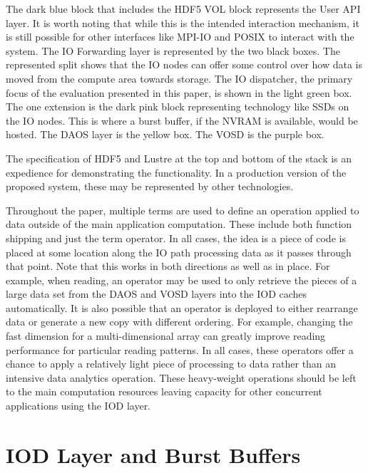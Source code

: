 \documentclass[conference]{IEEEtran}
\begin{document}
The dark blue block that includes the HDF5 VOL block represents the User API
layer. It is worth noting that while this is the intended interaction
mechanism, it is still possible for other interfaces like MPI-IO and POSIX to
interact with the system. The IO Forwarding layer is represented by the two
black boxes. The represented split shows that the IO nodes can offer some
control over how data is moved from the compute area towards storage. The
IO dispatcher, the primary focus of the evaluation presented in this paper, is
shown in the light green box. The one extension is the dark pink block
representing technology like SSDs on the IO nodes. This is where a burst
buffer, if the NVRAM is available, would be hosted. The DAOS layer is the
yellow box. The VOSD is the purple box.

The specification of HDF5 and Lustre at the top and bottom of the stack is 
an expedience for demonstrating the functionality. In a production version of
the proposed system, these may be represented by other technologies.

Throughout the paper, multiple terms are used to define an operation applied to
data outside of the main application computation. These include both function
shipping and just the term operator. In all cases, the idea is a piece of code
is placed at some location along the IO path processing data as it passes
through that point. Note that this works in both directions as well as in
place. For example, when reading, an operator may be used to only retrieve the
pieces of a large data set from the DAOS and VOSD layers into the IOD caches
automatically.  It is also possible that an operator is deployed to either
rearrange data or generate a new copy with different ordering. For example,
changing the fast dimension for a multi-dimensional array can greatly improve
reading performance for particular reading patterns. In all cases, these
operators offer a chance to apply a relatively light piece of processing to
data rather than an intensive data analytics operation. These heavy-weight
operations should be left to the main computation resources leaving capacity
for other concurrent applications using the IOD layer.

\section{IOD Layer and Burst Buffers}
\label{sec:burst}
\end{document}
